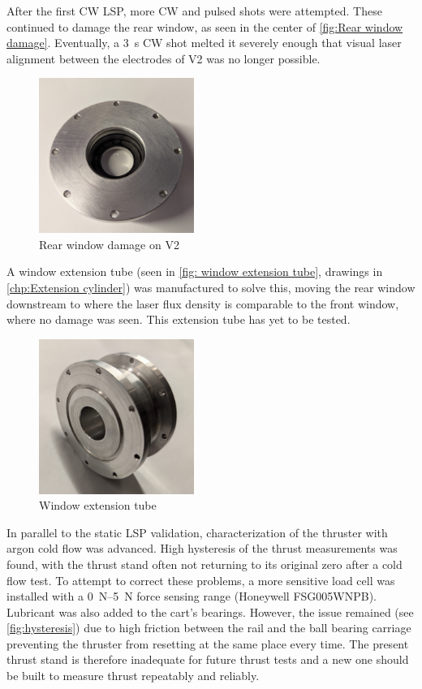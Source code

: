 After the first CW LSP, more CW and pulsed shots were attempted. These continued to damage the rear window, as seen in the center of \autoref{fig:Rear window damage}. Eventually, a \qty{3}{s} CW shot melted it severely enough that visual laser alignment between the electrodes of V2 was no longer possible.
\begin{figure}[!ht]
    \centering
    \includegraphics[width=0.45\textwidth]{assets/4 experiments/window damage.jpg}
    \caption{Rear window damage on V2}
    \label{fig:Rear window damage}
\end{figure}
A window extension tube (seen in \autoref{fig: window extension tube}, drawings in \autoref{chp:Extension cylinder}) was manufactured to solve this, moving the rear window downstream to where the laser flux density is comparable to the front window, where no damage was seen. This extension tube has yet to be tested.
\begin{figure}[!ht]
    \centering
    \includegraphics[width=0.45\textwidth]{assets/5 discussion/Extension cylinder.jpg}
    \caption{Window extension tube}
    \label{fig: window extension tube}
\end{figure}

In parallel to the static LSP validation, characterization of the thruster with argon cold flow was advanced. High hysteresis of the thrust measurements was found, with the thrust stand often not returning to its original zero after a cold flow test. To attempt to correct these problems, a more sensitive load cell was installed with a \qtyrange{0}{5}{N} force sensing range (Honeywell FSG005WNPB). Lubricant was also added to the cart's bearings. However, the issue remained (see \autoref{fig:hysteresis}) due to high friction between the rail and the ball bearing carriage preventing the thruster from resetting at the same place every time. The present thrust stand is therefore inadequate for future thrust tests and a new one should be built to measure thrust repeatably and reliably.

